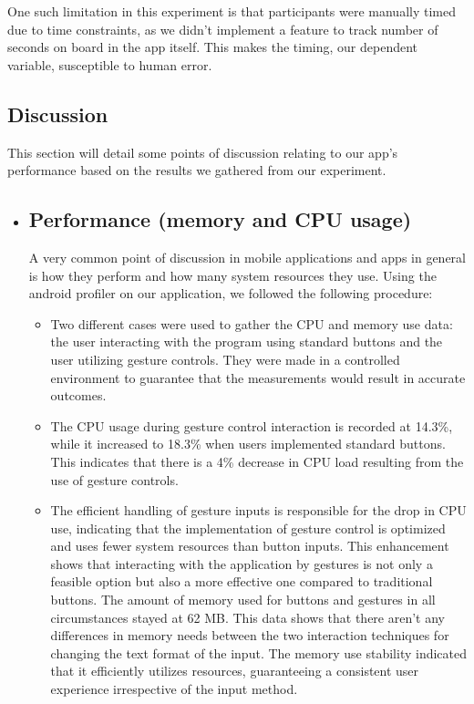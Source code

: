 \documentclass[conference]{IEEEtran}
\begin{document}
One such limitation in this experiment is that participants were manually timed due to time constraints, as we didn't implement a feature to track number of seconds on board in the app itself. This makes the timing, our dependent variable, susceptible to human error.



\subsection{Discussion}
This section will detail some points of discussion relating to our app's performance based on the results we gathered from our experiment.

\begin{itemize}
    \item \subsection*{Performance (memory and CPU usage)}
    A very common point of discussion in mobile applications and apps in general is how they perform and how many system resources they use. Using the android profiler on our application, we followed the following procedure:

    \begin{itemize}
        \item Two different cases were used to gather the CPU and memory use data: the user interacting with the program using standard buttons and the user utilizing gesture controls. They were made in a controlled environment to guarantee that the measurements would result in accurate outcomes.
        
        \item The CPU usage during gesture control interaction is recorded at 14.3\%, while it increased to 18.3\% when users implemented standard buttons. This indicates that there is a 4\% decrease in CPU load resulting from the use of gesture controls. 
        
        \item The efficient handling of gesture inputs is responsible for the drop in CPU use, indicating that the implementation of gesture control is optimized and uses fewer system resources than button inputs. This enhancement shows that interacting with the application by gestures is not only a feasible option but also a more effective one compared to traditional buttons. 
    The amount of memory used for buttons and gestures in all circumstances stayed at 62 MB. This data shows that there aren't any differences in memory needs between the two interaction techniques for changing the text format of the input. The memory use stability indicated that it efficiently utilizes resources, guaranteeing a consistent user experience irrespective of the input method.
    \end{itemize}


\end{itemize}
\end{document}

